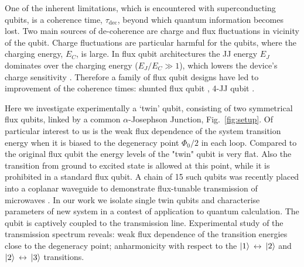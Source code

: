\documentclass[%
reprint,
superscriptaddress,
bibnotes,
amsmath,
amssymb,
aps,
showkeys,
prb,
]{revtex4-1}
\newcommand{\iket}[1]{\ensuremath{\Ket{#1}}}
\newcommand{\ilra}{\ensuremath{\,\leftrightarrow\,}}
\begin{document}
One  of the  inherent limitations,  which  is encountered with superconducting qubits, is  a coherence  time,
$\tau_{\text{dec}}$, beyond  which quantum information  becomes lost. Two main sources of de-coherence are charge and flux fluctuations in vicinity of the qubit. Charge fluctuations are particular harmful for the qubits, where the charging energy, $E_C$, is large. In  flux qubit
architectures the JJ  energy $E_J$ dominates over  the charging energy  ($E_J/E_C \gg 1$),
which lowers  the device's  charge sensitivity  \cite{Orlando_1999,Chiorescu_2003,Mooij_1999}. Therefore a
family  of flux qubit designs  have led to  improvement of the coherence  times: shunted
flux qubit \cite{Yan_2016} , 4-JJ qubit \cite{Qiu_2016,Pop_2014}.


Here we investigate experimentally a `twin'  qubit, consisting of two symmetrical flux qubits,
linked by a common $ \alpha$-Josephson Junction, Fig.~\ref{fig:setup}.  Of particular interest to us is the weak flux dependence of the
system transition  energy when  it is  biased to the  degeneracy point  $\Phi_0/2 $ in each loop. Compared to the original flux qubit the energy levels of the "twin" qubit is very flat. Also the transition from ground to excited state is allowed at this point, while it is prohibited in a standard flux qubit. A chain of 15 such qubits
was recently  placed into  a coplanar  waveguide to  demonstrate flux-tunable  transmission of
microwaves \cite{Shulga_2018}. In our work we  isolate single twin qubits and characterise parameters of new system in a contest of application to quantum calculation.
The qubit is captively coupled to the  transmission line. Experimental study of the transmission spectrum reveals: weak flux
dependence  of the  transition  energies close  to  the degeneracy  point;
anharmonicity with respect  to the  \iket{1}\ilra\iket{2} and  \iket{2}\ilra\iket{3} transitions.
\end{document}
